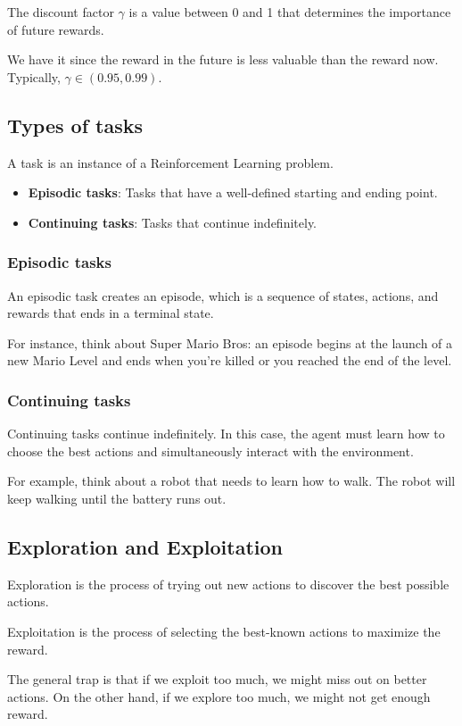 \begin{definition}
    The discount factor $\gamma$ is a value between 0 and 1 that determines the importance of future rewards.
\end{definition}
We have it since the reward in the future is less valuable than the reward now. Typically, $\gamma \in (0.95, 0.99)$.

\subsection{Types of tasks}
\begin{definition}
    A task is an instance of a Reinforcement Learning problem.
    \begin{itemize}
        \item \textbf{Episodic tasks}: Tasks that have a well-defined starting and ending point.
        \item \textbf{Continuing tasks}: Tasks that continue indefinitely.
    \end{itemize}
\end{definition}

\subsubsection{Episodic tasks}
An episodic task creates an episode, which is a sequence of states, actions, and rewards that ends in a terminal state. 

For instance, think about Super Mario Bros: an episode begins at the launch of a new Mario Level and ends when you’re killed or you reached the end of the level.

\subsubsection{Continuing tasks}
Continuing tasks continue indefinitely. In this case, the agent must learn how to choose the best actions and simultaneously interact with the environment.

For example, think about a robot that needs to learn how to walk. The robot will keep walking until the battery runs out.

\subsection{Exploration and Exploitation}

\begin{definition}
    Exploration is the process of trying out new actions to discover the best possible actions.
\end{definition}

\begin{definition}
    Exploitation is the process of selecting the best-known actions to maximize the reward.
\end{definition}

The general trap is that if we exploit too much, we might miss out on better actions. On the other hand, if we explore too much, we might not get enough reward.









